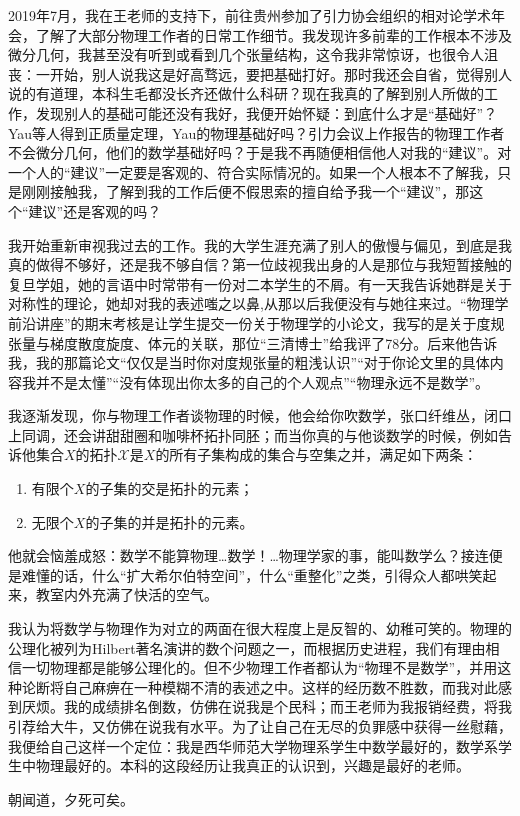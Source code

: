 	    2019年7月，我在王老师的支持下，前往贵州参加了引力协会组织的相对论学术年会，了解了大部分物理工作者的日常工作细节。我发现许多前辈的工作根本不涉及微分几何，我甚至没有听到或看到几个张量结构，这令我非常惊讶，也很令人沮丧：一开始，别人说我这是好高骛远，要把基础打好。那时我还会自省，觉得别人说的有道理，本科生毛都没长齐还做什么科研？现在我真的了解到别人所做的工作，发现别人的基础可能还没有我好，我便开始怀疑：到底什么才是“基础好”？Yau等人得到正质量定理，Yau的物理基础好吗？引力会议上作报告的物理工作者不会微分几何，他们的数学基础好吗？于是我不再随便相信他人对我的“建议”。对一个人的“建议”一定要是客观的、符合实际情况的。如果一个人根本不了解我，只是刚刚接触我，了解到我的工作后便不假思索的擅自给予我一个“建议”，那这个“建议”还是客观的吗？

	    我开始重新审视我过去的工作。我的大学生涯充满了别人的傲慢与偏见，到底是我真的做得不够好，还是我不够自信？第一位歧视我出身的人是那位与我短暂接触的复旦学姐，她的言语中时常带有一份对二本学生的不屑。有一天我告诉她群是关于对称性的理论，她却对我的表述嗤之以鼻,从那以后我便没有与她往来过。“物理学前沿讲座”的期末考核是让学生提交一份关于物理学的小论文，我写的是关于度规张量与梯度散度旋度、体元的关联，那位“三清博士”给我评了78分。后来他告诉我，我的那篇论文“仅仅是当时你对度规张量的粗浅认识”“对于你论文里的具体内容我并不是太懂”“没有体现出你太多的自己的个人观点”“物理永远不是数学”。

        我逐渐发现，你与物理工作者谈物理的时候，他会给你吹数学，张口纤维丛，闭口上同调，还会讲甜甜圈和咖啡杯拓扑同胚；而当你真的与他谈数学的时候，例如告诉他集合$X$的拓扑$\mathcal{X}$是$X$的所有子集构成的集合与空集之并，满足如下两条：
	    \begin{enumerate}
		    \item 有限个$X$的子集的交是拓扑的元素；
		    \item 无限个$X$的子集的并是拓扑的元素。
	    \end{enumerate}
	    他就会恼羞成怒：数学不能算物理…数学！…物理学家的事，能叫数学么？接连便是难懂的话，什么“扩大希尔伯特空间”，什么“重整化”之类，引得众人都哄笑起来，教室内外充满了快活的空气。

	    我认为将数学与物理作为对立的两面在很大程度上是反智的、幼稚可笑的。物理的公理化被列为Hilbert著名演讲的数个问题之一，而根据历史进程，我们有理由相信一切物理都是能够公理化的。但不少物理工作者都认为“物理不是数学”，并用这种论断将自己麻痹在一种模糊不清的表述之中。这样的经历数不胜数，而我对此感到厌烦。我的成绩排名倒数，仿佛在说我是个民科；而王老师为我报销经费，将我引荐给大牛，又仿佛在说我有水平。为了让自己在无尽的负罪感中获得一丝慰藉，我便给自己这样一个定位：我是西华师范大学物理系学生中数学最好的，数学系学生中物理最好的。本科的这段经历让我真正的认识到，兴趣是最好的老师。

        朝闻道，夕死可矣。

